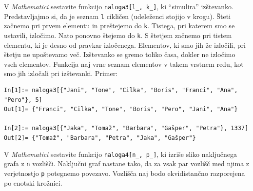 \documentclass[arhiv]{izpit}
\begin{document}
V \emph{Mathematici} sestavite funkcijo \texttt{naloga3[l\_, k\_]}, ki ``simulira'' izštevanko. Predstavljajmo si, da je seznam \texttt{l} cikličen (udeleženci stojijo v krogu). Šteti začnemo pri prvem elementu in preštejemo do \texttt{k}. Tistega, pri katerem smo se ustavili, izločimo. Nato ponovno štejemo do \texttt{k}. S štetjem začnemo pri tistem elementu, ki je desno od pravkar izločenega. Elementov, ki smo jih že izločili, pri štetju ne upoštevamo več. Izštevanko se gremo toliko časa, dokler ne izločimo vseh elementov. Funkcija naj vrne seznam elementov v takem vrstnem redu, kot smo jih izločali pri izštevanki. Primer:
%
\begin{verbatim}
In[1]:= naloga3[{"Jani", "Tone", "Cilka", "Boris", "Franci", "Ana", "Pero"}, 5]
Out[1]= {"Franci", "Cilka", "Tone", "Boris", "Pero", "Jani", "Ana"}

In[2]:= naloga3[{"Jaka", "Tomaž", "Barbara", "Gašper", "Petra"}, 1337]
Out[2]= {"Tomaž", "Barbara", "Petra", "Jaka", "Gašper"}
\end{verbatim}


V \emph{Mathematici} sestavite funkcijo \texttt{naloga4[n\_, p\_]}, ki izriše sliko naključnega grafa z \texttt{n} vozlišči. Naključni graf nastane tako, da za vsak par vozlišč med njima z verjetnostjo \texttt{p} potegnemo povezavo.
Vozlišča naj bodo ekvidistančno razporejena po enotski krožnici.
\end{document}
